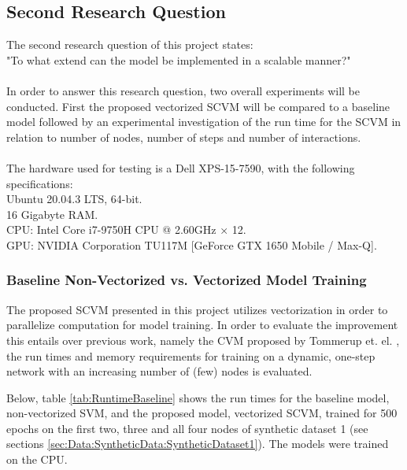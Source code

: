 \subsection{Second Research Question}
\label{sec:ResearchQuestion2}
The second research question of this project states:
\\
"To what extend can the model be implemented in a scalable manner?"
\\\\
In order to answer this research question, two overall experiments will be conducted.
First the proposed vectorized SCVM will be compared to a baseline model followed by an experimental investigation of the run time for the SCVM in relation to number of nodes, number of steps and number of interactions.
\\\\
The hardware used for testing is a Dell XPS-15-7590, with the following specifications:
\\
Ubuntu 20.04.3 LTS, 64-bit.
\\
16 Gigabyte RAM.
\\
CPU: Intel Core i7-9750H CPU @ 2.60GHz × 12.
\\
GPU: NVIDIA Corporation TU117M [GeForce GTX 1650 Mobile / Max-Q].


\subsubsection{Baseline Non-Vectorized vs. Vectorized Model Training}
\label{sec:ResearchQuestion2:BaselineComparison}
The proposed SCVM presented in this project utilizes vectorization in order to parallelize computation for model training.
In order to evaluate the improvement this entails over previous work, namely the CVM proposed by Tommerup et. el. \cite{Tommerup2021LearningNetworks}, the run times and memory requirements for training on a dynamic, one-step network with an increasing number of (few) nodes is evaluated.

Below, table \ref{tab:RuntimeBaseline} shows the run times for the baseline model, non-vectorized SVM, and the proposed model, vectorized SCVM, trained for 500 epochs on the first two, three and all four nodes of synthetic dataset 1 (see sections \ref{sec:Data:SyntheticData:SyntheticDataset1}).
The models were trained on the CPU.

